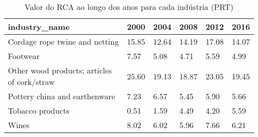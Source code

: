 \begin{table}
\centering
\caption{Valor do RCA ao longo dos anos para cada indústria (PRT)}
\begin{tabular}{p{6cm}p{1.5cm}p{1.5cm}p{1.5cm}p{1.5cm}p{1.5cm}}
\toprule
                              industry\_name &  2000 &  2004 &  2008 &  2012 &  2016 \\
\midrule
             Cordage rope twine and netting & 15.85 & 12.64 & 14.19 & 17.08 & 14.07 \\
                                   Footwear &  7.57 &  5.08 &  4.71 &  5.59 &  4.99 \\
Other wood products; articles of cork/straw & 25.60 & 19.13 & 18.87 & 23.05 & 19.45 \\
              Pottery china and earthenware &  7.23 &  6.57 &  5.45 &  5.90 &  5.66 \\
                           Tobacco products &  0.51 &  1.59 &  4.49 &  4.20 &  5.59 \\
                                      Wines &  8.02 &  6.02 &  5.96 &  7.66 &  6.21 \\
\bottomrule
\end{tabular}
\end{table}

